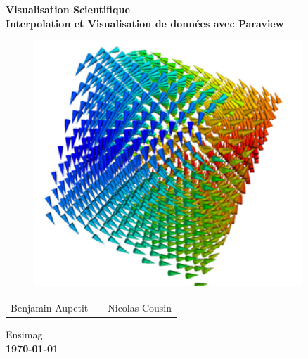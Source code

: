 \documentclass[a4paper,9pt]{article}
\begin{document}
\begin{titlepage}
\centering
\huge
\bfseries
Visualisation Scientifique\\[1\baselineskip]
\vspace{0.5cm}
\normalfont
\large
Interpolation et Visualisation de données avec Paraview\\[1\baselineskip]
	
\vspace{2cm}

\begin{figure}[!h]
\centering
\includegraphics[width=0.9\textwidth]{couverture.png}
\end{figure}

\vspace{1.5cm}

\centering
\bfseries
\normalfont

\begin{tabular}{r c l}
Benjamin Aupetit & & Nicolas Cousin
\end{tabular}	

\vspace{0.5cm}

Ensimag\\
\textbf{\today}
\end{titlepage}

\clearpage
\newpage

\tableofcontents

\clearpage
\newpage

\end{document}
